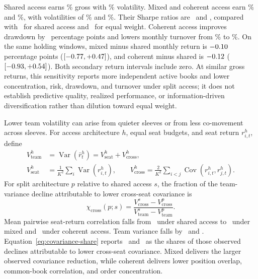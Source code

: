 \documentclass[sigconf]{acmart}
\begin{document}
Shared access earns \LongSharedReturn\% gross with \LongSharedVolatility\% volatility. Mixed and coherent access earn \LongMixedReturn\% and \LongCoherentReturn\%, with volatilities of \LongMixedVolatility\% and \LongCoherentVolatility\%. Their Sharpe ratios are \LongMixedSharpe\ and \LongCoherentSharpe, compared with \LongSharedSharpe\ for shared access and \LongEqualWeightSharpe\ for equal weight. Coherent access improves drawdown by \LongCoherentDrawdownImprovement\ percentage points and lowers monthly turnover from \LongSharedTurnover\% to \LongCoherentTurnover\%. On the same holding windows, mixed minus shared monthly return is $-0.10$ percentage points ($[-0.77, +0.47]$), and coherent minus shared is $-0.12$ ($[-0.93, +0.54]$). Both secondary return intervals include zero. At similar gross returns, this sensitivity reports more independent active books and lower concentration, risk, drawdown, and turnover under split access; it does not establish predictive quality, realized performance, or information-driven diversification rather than dilution toward equal weight.

Lower team volatility can arise from quieter sleeves or from less co-movement across sleeves. For access architecture $h$, equal seat budgets, and seat return $r_{i,t}^{h}$, define
\begin{align}
V_{\mathrm{team}}^{h}
&=\operatorname{Var}(\bar r_t^{h})
 =V_{\mathrm{seat}}^{h}+V_{\mathrm{cross}}^{h},\\
V_{\mathrm{seat}}^{h}
&=\frac{1}{K^2}\sum_i\operatorname{Var}(r_{i,t}^{h}),
\qquad
V_{\mathrm{cross}}^{h}
=\frac{2}{K^2}\sum_{i<j}\operatorname{Cov}(r_{i,t}^{h},r_{j,t}^{h}).
\label{eq:allocation-variance}
\end{align}
For split architecture $p$ relative to shared access $s$, the fraction of the team-variance decline attributable to lower cross-seat covariance is
\begin{equation}
\chi_{\mathrm{cross}}(p;s)=
\frac{V_{\mathrm{cross}}^{s}-V_{\mathrm{cross}}^{p}}
{V_{\mathrm{team}}^{s}-V_{\mathrm{team}}^{p}}.
\label{eq:covariance-share}
\end{equation}
Mean pairwise seat-return correlation falls from \AllocationSharedCorrelation\ under shared access to \AllocationMixedCorrelation\ under mixed and \AllocationCoherentCorrelation\ under coherent access. Team variance falls by \AllocationMixedVarianceReduction\ and \AllocationCoherentVarianceReduction. Equation~\eqref{eq:covariance-share} reports \AllocationMixedCovarianceShare\ and \AllocationCoherentCovarianceShare\ as the shares of those observed declines attributable to lower cross-seat covariance. Mixed delivers the larger observed covariance reduction, while coherent delivers lower position overlap, common-book correlation, and order concentration.
\end{document}

